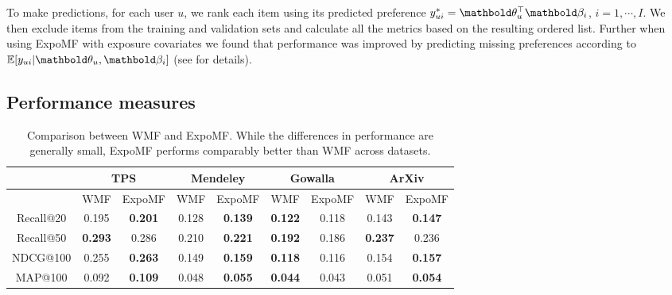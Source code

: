 To make predictions, for each user $u$, we rank each item using its predicted
preference ${y}^*_{ui} = \mb\theta_u^\top \mb\beta_i$, $i = 1, \cdots, I$.
We then exclude items from the training and validation sets and calculate all the
metrics based on the resulting ordered list. Further when using
ExpoMF with exposure covariates we found that performance was improved by predicting missing preferences
according to $\mathbb{E}[y_{ui}|\mb\theta_u,\mb\beta_i]$ (see  for details).

\subsection{Performance measures}

\begin{table}
\centering
\begin{tabular}{ c | c c | c c | c c | c c  }
   & \multicolumn{2}{c}{\textbf{TPS}} & \multicolumn{2}{c}{\textbf{Mendeley}} & \multicolumn{2}{c}{\textbf{Gowalla}} & \multicolumn{2}{c}{\textbf{ArXiv}} \\ \hline
    & WMF & ExpoMF	& WMF & ExpoMF 	& WMF& ExpoMF &	 WMF & ExpoMF \\ \hline
  Recall@20 &  0.195 &  \textbf{0.201}              & 0.128 &  \textbf{0.139}                & \textbf{0.122} & 0.118                          &  0.143 & \textbf{0.147} \\
  Recall@50 &  \textbf{0.293} &  0.286              & 0.210 & \textbf{0.221}                  & \textbf{0.192} & 0.186                         & \textbf{0.237} & 0.236 \\
  NDCG@100  &  0.255 &  \textbf{0.263}              & 0.149 & \textbf{0.159}                 & \textbf{0.118} & 0.116                         & 0.154 & \textbf{0.157} \\
  MAP@100   &  0.092 &  \textbf{0.109}             & 0.048 & \textbf{0.055}                  & \textbf{0.044} & 0.043                         & 0.051 & \textbf{0.054}\\
\end{tabular}
\caption{Comparison between WMF \cite{hu2008collaborative} and ExpoMF. While
the differences in performance are generally small, ExpoMF performs comparably better than WMF across datasets.}
\label{tab:cfresults}
\end{table}

